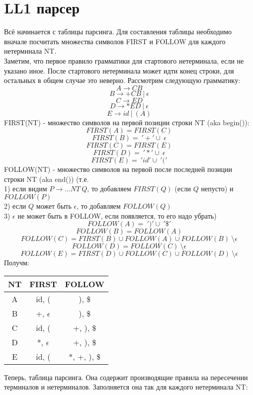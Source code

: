 \documentclass{article}
\begin{document}
\part{LL1 парсер}
Всё начинается с таблицы парсинга. Для составления таблицы необходимо вначале 
посчитать множества символов FIRST и FOLLOW для каждого нетерминала NT. 
\\Заметим, что первое правило грамматики для стартового нетерминала, 
если не указано иное. После стартового нетерминала может 
идти конец строки, для остальных в общем случае это неверно.
Рассмотрим следующую грамматику:
$$A \to CB $$
$$B \to +CB \ | \ \epsilon $$
$$C \to ED $$
$$D \to *ED \ | \ \epsilon$$
$$E \to id \ | \ (A)$$
FIRST(NT) - множество символов на первой позиции строки NT (aka begin()):\\
$$FIRST(A)=FIRST(C)$$
$$FIRST(B)=\ '+' \cup \ \epsilon$$
$$FIRST(C)=FIRST(E)$$
$$FIRST(D)=\ '*' \cup \ \epsilon$$
$$FIRST(E)=\ 'id' \cup \ '('$$
FOLLOW(NT) - множество символов на первой после последней
позиции строки NT (aka end()) (т.е.  \\ 
1) если видим $P \to ... NT \ Q$, то 
добавляем $FIRST(Q)$ (если $Q$ непусто) и $FOLLOW(P)$ \\
2) если $Q$ может быть $\epsilon$, то добавляем $FOLLOW(Q)$ \\
3) $\epsilon$ не может быть в FOLLOW, если появляется, то его надо убрать)
$$FOLLOW(A)=\ ')' \cup \ '\$' $$
$$FOLLOW(B)=FOLLOW(A)$$
$$FOLLOW(C)=FIRST(B) \cup FOLLOW(A) \cup FOLLOW(B)\ \setminus \epsilon$$
$$FOLLOW(D)=FOLLOW(C) \ \setminus \epsilon$$
$$FOLLOW(E)=FIRST(D) \cup FOLLOW(C) \cup FOLLOW(D)\ \setminus \epsilon$$
Получм:\\
\begin{center}
  \begin{tabular}{ c|c|c }
    NT & FIRST & FOLLOW         \\
    \hline
    A &  id, ( & ), \$          \\
    \hline
    B &  +, $\epsilon$ & ), \$    \\
    \hline
    C &  id, ( & +, ), \$       \\
    \hline
    D &  *, $\epsilon$ & +, ), \$ \\
    \hline
    E &  id, ( & *, +, ), \$ 
  \end{tabular}
\end{center}
Теперь, таблица парсинга. Она содержит производящие правила на пересечении 
терминалов и нетерминалов. Заполняется
она так для каждого нетерминала NT:\\
\end{document}

